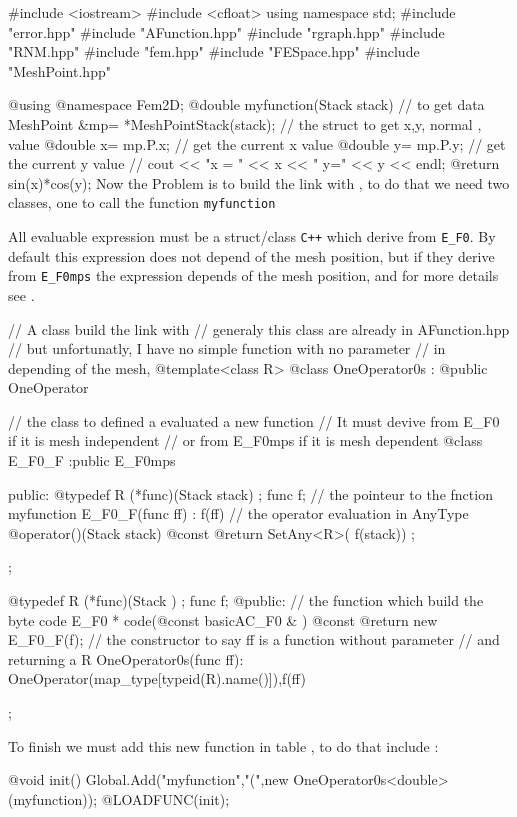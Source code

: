 \documentclass[a4paper,twoside,12pt]{book}
\begin{document}
\bFF
#include  <iostream>
#include  <cfloat>
using namespace std;
#include "error.hpp"
#include "AFunction.hpp"
#include "rgraph.hpp"
#include "RNM.hpp"
#include "fem.hpp"
#include "FESpace.hpp"
#include "MeshPoint.hpp"

@using @namespace Fem2D;
@double myfunction(Stack stack)
{
  //  to get \freefempp  data
  MeshPoint &mp= *MeshPointStack(stack); // the struct to get x,y, normal , value
  @double x= mp.P.x; // get the current x value
  @double y= mp.P.y; // get the current y value
  //  cout << "x = " << x << " y=" << y << endl;
  @return sin(x)*cos(y);
}
\eFF
Now the Problem is to build the link with \freefempp, to do that
we need two classes, one to call the function \texttt{myfunction}

All \freefempp evaluable expression must be a struct/class  \texttt{C++}  which
derive from \texttt{E\_F0}. By default this expression does not depend of the mesh position,
but if they   derive from \texttt{E\_F0mps} the expression depends of the mesh position,
and for more details see \cite{FHcpp}.



\bFF
//  A class build the link with \freefempp
// generaly this class are already in AFunction.hpp
// but unfortunatly, I have no simple function with no parameter
// in \freefempp depending of the mesh,
@template<class R>
@class  OneOperator0s : @public OneOperator {

  // the class to defined a evaluated a new function
  //  It  must devive from  E\_F0 if it is mesh independent
  //   or from E\_F0mps if it is mesh dependent
  @class E_F0_F :public  E_F0mps { public:
    @typedef  R (*func)(Stack stack) ;
    func f; // the pointeur to the fnction myfunction
    E_F0_F(func ff)  : f(ff) {}
    // the operator evaluation in \freefempp
    AnyType @operator()(Stack stack)  @const {@return SetAny<R>( f(stack)) ;}

  };

  @typedef  R (*func)(Stack ) ;
  func  f;
@public:
  // the function which build the \freefempp byte code
  E_F0 * code(@const basicAC_F0 & ) @const { @return  new E_F0_F(f);}
  // the constructor to say ff is a function without parameter
  // and returning a R
  OneOperator0s(func  ff): OneOperator(map_type[typeid(R).name()]),f(ff){}
};
\eFF


 To finish we must add this new function in \freefempp table ,
 to do that include :
 
\bFF
@void init(){
  Global.Add("myfunction","(",new OneOperator0s<double>(myfunction));
}
@LOADFUNC(init);
\eFF
\end{document}
